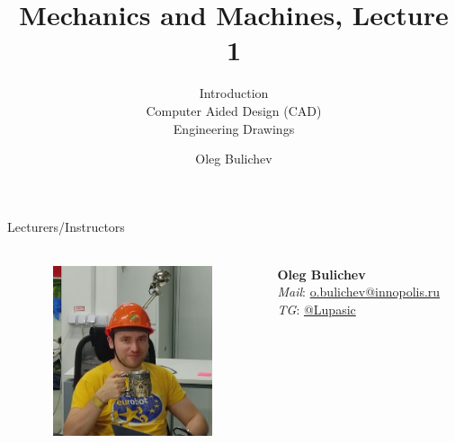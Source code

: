 \documentclass[aspectratio=169]{beamer}
\title[MaM]{Mechanics and Machines, Lecture 1} %
\subtitle{Introduction  
\\ Computer Aided Design (CAD) \\ Engineering Drawings } %
\author{Oleg Bulichev}
\newcommand{\fbckg}[1]{\usebackgroundtemplate{\texttt{[image: \#1]}}}%
\begin{document}
\setlength{\abovedisplayskip}{0pt}
\setlength{\belowdisplayskip}{0pt}
\setlength{\abovedisplayshortskip}{0pt}
\setlength{\belowdisplayshortskip}{0pt}

\fbckg{fibeamer/figs/title_page.png}

\fbckg{fibeamer/figs/common.png}

\note{\scriptsize \begin{itemize}
        \item \
    \end{itemize}}

\begin{frame}[t]{Lecturers/Instructors}
    \framesubtitle{}
    \begin{columns}[T,onlytextwidth]
        \begin{column}{0.49\textwidth}
            \begin{figure}[H]
                \centering\includegraphics[height=5cm,width=1\textwidth,keepaspectratio]{Oleg.jpg}
                \label{fig:Oleg.jpg}
            \end{figure}
        \end{column}
        \begin{column}{0.49\textwidth}
            \Large
            \vspace{2cm}
            \centering
            \textbf{Oleg Bulichev} \\
            \textit{Mail}: \url{o.bulichev@innopolis.ru}\\
            \textit{TG}: \url{@Lupasic}
        \end{column}
    \end{columns}
\end{frame}
\end{document}
